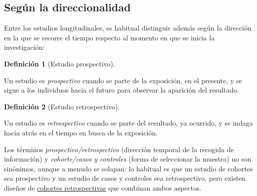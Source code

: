 \documentclass[
  spanish,
  a4paper,
]{scrreport}
\theoremstyle{definition}
\theoremstyle{definition}
\newtheorem{definition}{Definición}[chapter]
\theoremstyle{remark}
\begin{document}
\subsection{Según la direccionalidad}\label{seguxfan-la-direccionalidad}

Entre los estudios longitudinales, es habitual distinguir además según
la dirección en la que se recorre el tiempo respecto al momento en que
se inicia la investigación:

\begin{definition}[Estudio
prospectivo]\protect\hypertarget{def-estudio-prospectivo}{}\label{def-estudio-prospectivo}

Un estudio es \emph{prospectivo} cuando se parte de la exposición, en el
presente, y se sigue a los individuos hacia el futuro para observar la
aparición del resultado.

\end{definition}

\begin{definition}[Estudio
retrospectivo]\protect\hypertarget{def-estudio-retrospectivo}{}\label{def-estudio-retrospectivo}

Un estudio es \emph{retrospectivo} cuando se parte del resultado, ya
ocurrido, y se indaga hacia atrás en el tiempo en busca de la
exposición.

\end{definition}

\begin{tcolorbox}[enhanced jigsaw, arc=.35mm, bottomrule=.15mm, bottomtitle=1mm, breakable, colback=white, colbacktitle=quarto-callout-important-color!10!white, colframe=quarto-callout-important-color-frame, coltitle=black, left=2mm, leftrule=.75mm, opacityback=0, opacitybacktitle=0.6, rightrule=.15mm, title=\textcolor{quarto-callout-important-color}{\faExclamation}\hspace{0.5em}{Importante}, titlerule=0mm, toprule=.15mm, toptitle=1mm]

Los términos \emph{prospectivo/retrospectivo} (dirección temporal de la
recogida de información) y \emph{cohorte/casos y controles} (forma de
seleccionar la muestra) no son sinónimos, aunque a menudo se solapan: lo
habitual es que un estudio de cohortes sea prospectivo y un estudio de
casos y controles sea retrospectivo, pero existen diseños de
\href{04-estudios-cohortes.qmd}{cohortes retrospectivas} que combinan
ambos aspectos.

\end{tcolorbox}
\end{document}
